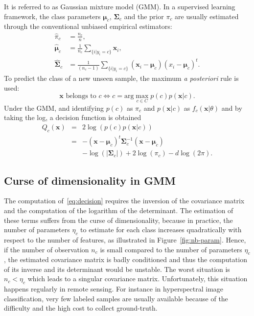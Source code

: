 \documentclass[journal]{IEEEtran}
\begin{document}
    It  is  referred  to  as  Gaussian  mixture  model  (GMM).   In  a
    supervised    learning    framework,    the    class    parameters
    $\boldsymbol{\mu}_c$,   $\boldsymbol{\Sigma}_c$   and  the   prior
    $\pi_c$ are  usually estimated  through the  conventional unbiased
    empirical estimators:
    \begin{align}
        \hat{\pi}_c &= \frac{n_c}{n},\\
        \hat{\boldsymbol{\mu}}_c &= \frac{1}{n_c} \sum_{\{i|y_i = c\}} \mathbf{x}_i ,\\
        \hat{\boldsymbol{\Sigma}}_c &= \frac{1}{(n_c - 1)} \sum_{\{i|y_i = c\}} (\mathbf{x}_i - \boldsymbol{\mu}_c) (\boldsymbol{}x_i - \boldsymbol{\mu}_c)^t.
    \end{align}
    To predict the  class of a new unseen sample,  the maximum \emph{a
      posteriori}  rule  is  used:
    \begin{equation*}
        \mathbf{x} \text{ belongs to } c \Leftrightarrow c = \text{arg} \max_{c \in C} p(c) p(\mathbf{x}|c).
    \end{equation*}
    Under the GMM,  and identifying $p(c)$ as $\pi_c$  and $p(\mathbf{x}|c)$ as
    $f_c(\mathbf{x}|\theta)$ and by taking the log, a decision function is obtained
    \begin{eqnarray}\label{eq:decision}
      Q_c(\mathbf{x}) &=& 2 \log \left( p(c) p(\mathbf{x}|c) \right) \nonumber \\
                      &=& - (\mathbf{x} - \boldsymbol{\mu}_c)^t \boldsymbol{\Sigma}_c^{-1} (\mathbf{x} - \boldsymbol{\mu}_c) \nonumber \\
                      & &-\log (|\boldsymbol{\Sigma}_c|) + 2 \log (\pi_c) - d \log (2\pi).
    \end{eqnarray}

    \subsection{Curse of dimensionality in GMM}
    \label{sec:curse:gmm}

    The computation of~\ref{eq:decision} requires the inversion of the
    covariance matrix and the  computation of the logarithm of the
    determinant.  The estimation of these terms suffers from the curse
    of  dimensionality\cite{bouveyron2014model}, because  in practice,
    the  number of  parameters  $\eta_c$ to  estimate  for each  class
    increases quadratically with respect to the number of features, as
    illustrated in Figure~\ref{fig:nb-param}.  Hence, if the number of
    observation  $n_c$ is  small  compared to  the  number of parameters
    $\eta_c$, the  estimated covariance  matrix is badly  conditioned and
    thus the computation  of its inverse and its  determinant would be
    unstable.   The worst  situation  is $n_c<\eta_c$  which leads  to
    a singular covariance matrix.  Unfortunately, this situation happens
    regularly in remote sensing.   For instance in hyperspectral image
    classification,  very few  labeled samples  are usually  available
    because of the difficulty and the high cost to collect ground-truth.
\end{document}
